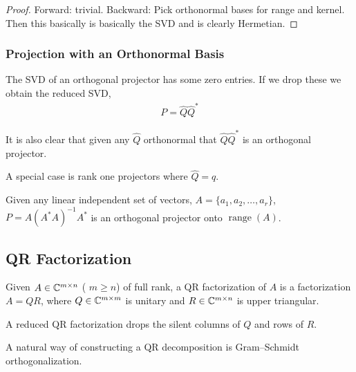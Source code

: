 \documentclass[12pt]{article}
\begin{document}
\begin{proof}
Forward: trivial.
Backward: Pick orthonormal bases for range and kernel. Then this basically is basically the SVD and is clearly Hermetian.
\end{proof}


\subsubsection{Projection with an Orthonormal Basis}
The SVD of an orthogonal projector has some zero entries. If we drop these we obtain the reduced SVD,
\begin{align*}
    P = \hat{Q}\hat{Q}^*
\end{align*}

It is also clear that given any \( \hat{Q} \) orthonormal that \( \hat{Q}\hat{Q}^* \) is an orthogonal projector.

A special case is rank one projectors where \( \hat{Q} = q \).

\begin{theorem}
Given any linear independent set of vectors, \( A = \{a_1, a_2, \ldots, a_r \} \), \( P = A(A^*A)^{-1}A^* \) is an orthogonal projector onto \( \operatorname{range}(A) \).
\end{theorem}

\subsection{QR Factorization}

\begin{definition}[QR Factorization]
Given \( A\in \mathbb{C}^{m\times n} \) ( \( m\geq n \)) of full rank, a QR factorization of \( A \) is a factorization \( A = QR \), where \( Q \in \mathbb{C}^{m\times m} \) is unitary and \( R\in \mathbb{C}^{m\times n} \) is upper triangular.

A reduced QR factorization drops the silent columns of \( Q \) and rows of \( R \).
\end{definition}

A natural way of constructing a QR decomposition is Gram--Schmidt orthogonalization.

\begin{algorithm}
\begin{algorithmic}
    \EndFor
\EndFor
\end{algorithmic}
\end{algorithm}
\end{document}
